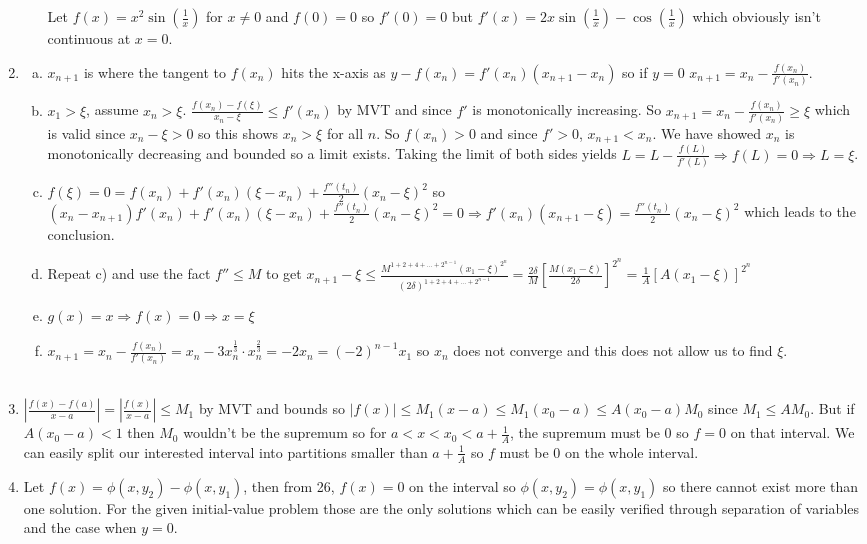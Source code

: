 \documentclass{article}
\begin{document}
\begin{enumerate}
\begin{enumerate}[(a)]
Let $f(x)=x^2\sin\left(\frac{1}{x}\right)$ for $x\neq 0$ and $f(0) = 0$ so $f'(0) = 0$ but $f'(x) = 2x \sin\left(\frac{1}{x}\right) - \cos\left(\frac{1}{x}\right)$ which obviously isn't continuous at $x=0$. \\
\end{enumerate}
\setcounter{enumi}{24}
\item 
\begin{enumerate}[(a)]
\item $x_{n+1}$ is where the tangent to $f(x_n)$ hits the x-axis as $y-f(x_n) = f'(x_n) (x_{n+1} - x_n)$ so if $y=0$ $x_{n+1} = x_n - \frac{f(x_n)}{f'(x_n)}$. \\
\item $x_1 >\xi$, assume $x_n > \xi$. $\frac{f(x_n) - f(\xi)}{x_n-\xi} \leq f'(x_n)$ by MVT and since $f'$ is monotonically increasing. So $x_{n+1} = x_n -\frac{f(x_n)}{f'(x_n)} \geq \xi$ which is valid since $x_n-\xi > 0$ so this shows $x_n > \xi$ for all $n$. So $f(x_n) > 0$ and since $f' > 0$, $x_{n+1} < x_n$. We have showed $x_n$ is monotonically decreasing and bounded so a limit exists. Taking the limit of both sides yields $L=L-\frac{f(L)}{f'(L)} \Rightarrow f(L) = 0 \Rightarrow L=\xi$. 
\item $f(\xi) = 0 = f(x_n) + f'(x_n) (\xi - x_n) + \frac{f''(t_n)}{2} (x_n - \xi)^2$ so $(x_n-x_{n+1})f'(x_n)+ f'(x_n) (\xi - x_n) + \frac{f''(t_n)}{2} (x_n - \xi)^2=0\Rightarrow f'(x_n) (x_{n+1}-\xi) = \frac{f''(t_n)}{2} (x_n - \xi)^2$ which leads to the conclusion.
\item Repeat c) and use the fact $f'' \leq M $ to get $x_{n+1}-\xi \leq \frac{M^{1+2+4+...+2^{n-1}} (x_1 - \xi)^{2^n}}{(2\delta)^{1+2+4+...+2^{n-1}}}=\frac{2\delta}{M}\left[\frac{M (x_1-\xi)}{2\delta}\right]^{2^n}=\frac{1}{A}[A(x_1-\xi)]^{2^n}$\\
\item $g(x) = x\Rightarrow f(x) = 0 \Rightarrow x=\xi$
\item $x_{n+1} = x_n - \frac{f(x_n)}{f'(x_n)} = x_n - 3 x_n^{\frac{1}{3}}\cdot x_n^{\frac{2}{3}}=-2x_n=(-2)^{n-1}x_1$ so $x_n$ does not converge and this does not allow us to find $\xi$.\\
\\
\end{enumerate}
\item $|\frac{f(x)-f(a)}{x-a}| =|\frac{f(x)}{x-a}|\leq M_1$ by MVT and bounds so $|f(x)|\leq M_1 (x-a) \leq M_1 (x_0 - a)\leq A(x_0-a)M_0$ since $M_1 \leq A M_0$. But if $A(x_0 -a) < 1$ then $M_0$ wouldn't be the supremum so for $a<x< x_0 < a+\frac{1}{A}$, the supremum must be $0$ so $f=0$ on that interval. We can easily split our interested interval into partitions smaller than $a+\frac{1}{A}$ so $f$ must be $0$ on the whole interval.\\
\item Let $f(x)=\phi(x, y_2) - \phi (x, y_1)$, then from 26, $f(x) = 0$ on the interval so $\phi(x, y_2) = \phi(x, y_1)$ so there cannot exist more than one solution. For the given initial-value problem those are the only solutions which can be easily verified through separation of variables and the case when $y=0$.
\\
\end{enumerate}
\end{document}
